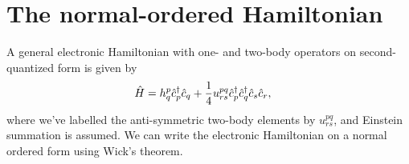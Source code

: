     \section{The normal-ordered Hamiltonian}
        A general electronic Hamiltonian with one- and two-body operators on
        second-quantized form is given by
        \begin{align}
            \hat{H}
            &= h^{p}_{q}\hat{c}_{p}^{\dagger}\hat{c}_{q}
            + \frac{1}{4}u^{pq}_{rs}\hat{c}_{p}^{\dagger}\hat{c}_{q}^{\dagger}\hat{c}_{s}\hat{c}_{r},
        \end{align}
        where we've labelled the anti-symmetric two-body elements by
        $u^{pq}_{rs}$, and Einstein summation is assumed.
        We can write the electronic Hamiltonian on a normal ordered form using
        Wick's theorem.
